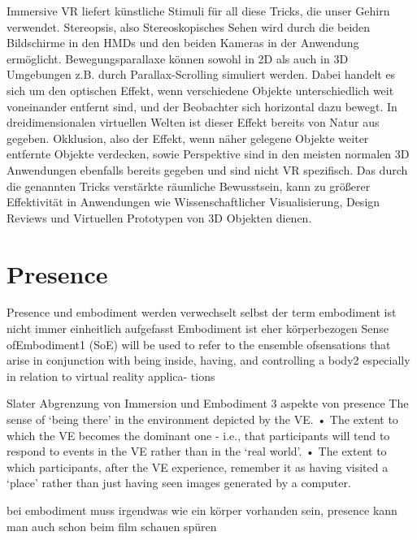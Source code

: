 Immersive VR liefert künstliche Stimuli für all diese Tricks, die unser Gehirn verwendet. Stereopsis, also Stereoskopisches Sehen wird durch die beiden Bildschirme in den HMDs und den beiden Kameras in der Anwendung ermöglicht. Bewegungsparallaxe können sowohl in 2D als auch in 3D Umgebungen z.B. durch Parallax-Scrolling simuliert werden. Dabei handelt es sich um den optischen Effekt, wenn verschiedene Objekte unterschiedlich weit voneinander entfernt sind, und der Beobachter sich horizontal dazu bewegt. In dreidimensionalen virtuellen Welten ist dieser Effekt bereits von Natur aus gegeben. Okklusion, also der Effekt, wenn näher gelegene Objekte weiter entfernte Objekte verdecken, sowie Perspektive sind in den meisten normalen 3D Anwendungen ebenfalls bereits gegeben und sind nicht VR spezifisch.
Das durch die genannten Tricks verstärkte räumliche Bewusstsein, kann zu größerer Effektivität in Anwendungen wie Wissenschaftlicher Visualisierung, Design Reviews und Virtuellen Prototypen von 3D Objekten dienen.

\section{Presence}
Presence und embodiment werden verwechselt
selbst der term embodiment ist nicht immer einheitlich aufgefasst \cite{Kilteni2012}
Embodiment ist eher körperbezogen
Sense ofEmbodiment1 (SoE) will be used to refer to the ensemble ofsensations that arise in conjunction with being inside, having, and controlling a body2 especially in relation to virtual reality applica- tions

Slater\cite{Slater2003}\cite{Slater1999}
Abgrenzung von Immersion und Embodiment
3 aspekte von presence
The sense of ‘being there’ in the environment depicted by the VE. • The extent to which the VE becomes the dominant one - i.e., that participants will tend to respond to events in the VE rather than in the ‘real world’.
• The extent to which participants, after the VE experience, remember it as having visited a ‘place’ rather than just having seen images generated by a computer.


bei embodiment muss irgendwas wie ein körper vorhanden sein, presence kann man auch schon beim film schauen spüren


